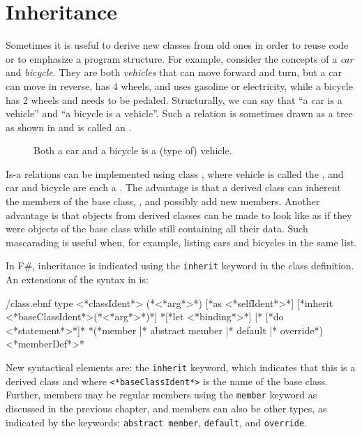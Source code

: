 \documentclass[fsharpNotes.tex]{subfiles}
\begin{document}
\section{Inheritance}
\label{sec:inheritance}
Sometimes it is useful to derive new classes from old ones in order to reuse code or to emphasize a program structure. For example, consider the concepts of a \emph{car} and \emph{bicycle}. They are both \emph{vehicles} that can move forward and turn, but a car can move in reverse, has 4 wheels, and uses gasoline or electricity, while a bicycle has 2 wheels and needs to be pedaled. Structurally, we can say that ``a car is a vehicle'' and ``a bicycle is a vehicle''. Such a relation is sometimes drawn as a tree as shown in  and is called an .
%
\begin{figure}
  \centering
  \caption{Both a car and a bicycle is a (type of) vehicle.}
  \label{fig:inheritanceVehicle}
\end{figure}
%
Is-a relations can be implemented using class , where vehicle is called the , and car and bicycle are each a . The advantage is that a derived class can inherent the members of the base class, , and possibly add new members. Another advantage is that objects from derived classes can be made to look like as if they were objects of the base class while still containing all their data. Such mascarading is useful when, for example, listing cars and bicycles in the same list.

In F\#, inheritance is indicated using the \lstinline[language=syntax]{inherit} keyword in the class definition. An extensions of the syntax in  is:
%
\begin{verbatimwrite}{\ebnf/class.ebnf}
type <*classIdent*> ({*<*arg*>*}) [*as <*selfIdent*>*] 
  [*inherit <*baseClassIdent*>({*<*arg*>*})*]
  {*[*let <*binding*>*] |* [*do <*statement*>*]*}
  {*(*member |* abstract member |* default |* override*) <*memberDef*>*}
\end{verbatimwrite}
%
New syntactical elements are: the  \lstinline{inherit} keyword, which indicates that this is a derived class and where \lstinline[language=syntax]{<*baseClassIdent*>} is the name of the base class. Further, members may be regular members using the \lstinline{member} keyword as discussed in the previous chapter, and members can also be other types, as indicated by the keywords: \lstinline{abstract member}, \lstinline{default}, and \lstinline{override}.
\end{document}
